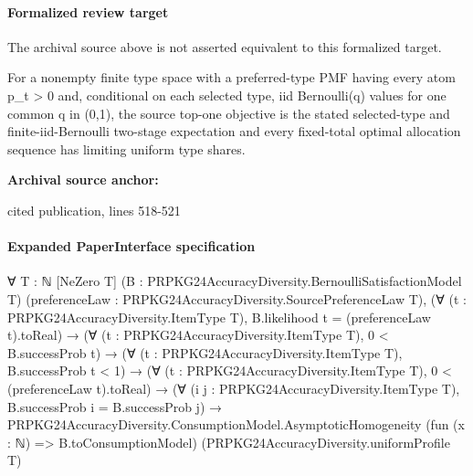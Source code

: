 \documentclass[10pt]{article}
\begin{document}
\paragraph{Formalized review target}
The archival source above is not asserted equivalent to this formalized target.
\begin{ReviewVerbatim}
For a nonempty finite type space with a preferred-type PMF having every atom p_t > 0 and, conditional on each selected type, iid Bernoulli(q) values for one common q in (0,1), the source top-one objective is the stated selected-type and finite-iid-Bernoulli two-stage expectation and every fixed-total optimal allocation sequence has limiting uniform type shares.
\end{ReviewVerbatim}

\textbf{Archival source anchor:} {\footnotesize\raggedright cited publication, lines 518-\allowbreak{}521\par}
\paragraph{Expanded PaperInterface specification}
\begin{ReviewVerbatim}
∀ {T : ℕ} [NeZero T] (B : PRPKG24AccuracyDiversity.BernoulliSatisfactionModel T)
  (preferenceLaw : PRPKG24AccuracyDiversity.SourcePreferenceLaw T),
  (∀ (t : PRPKG24AccuracyDiversity.ItemType T), B.likelihood t = (preferenceLaw t).toReal) →
    (∀ (t : PRPKG24AccuracyDiversity.ItemType T), 0 < B.successProb t) →
      (∀ (t : PRPKG24AccuracyDiversity.ItemType T), B.successProb t < 1) →
        (∀ (t : PRPKG24AccuracyDiversity.ItemType T), 0 < (preferenceLaw t).toReal) →
          (∀ (i j : PRPKG24AccuracyDiversity.ItemType T), B.successProb i = B.successProb j) →
            PRPKG24AccuracyDiversity.ConsumptionModel.AsymptoticHomogeneity (fun (x : ℕ) => B.toConsumptionModel)
              (PRPKG24AccuracyDiversity.uniformProfile T)
\end{ReviewVerbatim}
\end{document}
